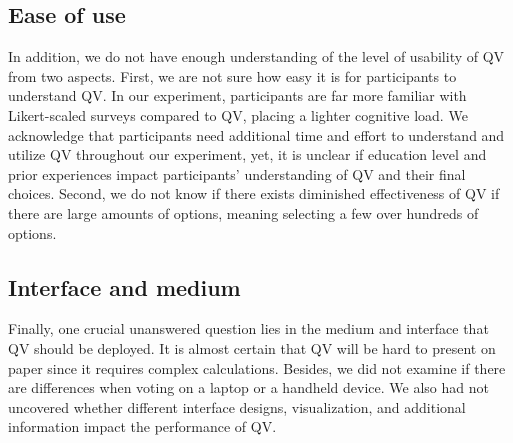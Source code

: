 \subsection{Ease of use}
In addition, we do not have enough understanding of the level of usability of QV from two aspects.
First, we are not sure how easy it is for participants to understand QV.
In our experiment, participants are far more familiar with Likert-scaled surveys compared to QV, placing a lighter cognitive load.
We acknowledge that participants need additional time and effort to understand and utilize QV throughout our experiment, yet, it is unclear if education level and prior experiences impact participants' understanding of QV and their final choices.
Second, we do not know if there exists diminished effectiveness of QV if there are large amounts of options, meaning selecting a few over hundreds of options.

\subsection{Interface and medium}
Finally, one crucial unanswered question lies in the medium and interface that QV should be deployed.
It is almost certain that QV will be hard to present on paper since it requires complex calculations. 
Besides, we did not examine if there are differences when voting on a laptop or a handheld device.
We also had not uncovered whether different interface designs, visualization, and additional information impact the performance of QV.

